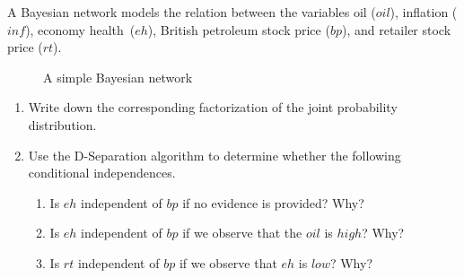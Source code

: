 \documentclass[11pt]{article}
\newcounter{marks}
\begin{document}
\begin{list}{{\bf Question :}}
\item
{}
\addtocounter{marks}{1}
A Bayesian network models the relation between the variables oil ($oil$), inflation ($inf$), economy health~($eh$), British petroleum stock price ($bp$), and retailer stock price ($rt$).
\begin{figure}[!th]
\begin{center}
 \caption{A simple Bayesian network}\label{fig:oil}
\end{center}
\end{figure}
\vspace{-1cm}
   \begin{enumerate}
    \item Write down the corresponding factorization of the joint probability distribution.
    \item Use the D-Separation algorithm to determine whether the following conditional independences.
\begin{enumerate}
\item Is $eh$ independent of $bp$ if no evidence is provided? Why?
\item Is $eh$ independent of $bp$ if we observe that the $oil$ is $high$? Why?
\item Is $rt$ independent of $bp$ if we observe that $eh$ is $low$? Why?
\end{enumerate}
\end{enumerate}
\framebox[16cm][l]{ 
\parbox{15.9cm}{
\vspace*{4.5cm}
}}


\end{list}
\end{document}
